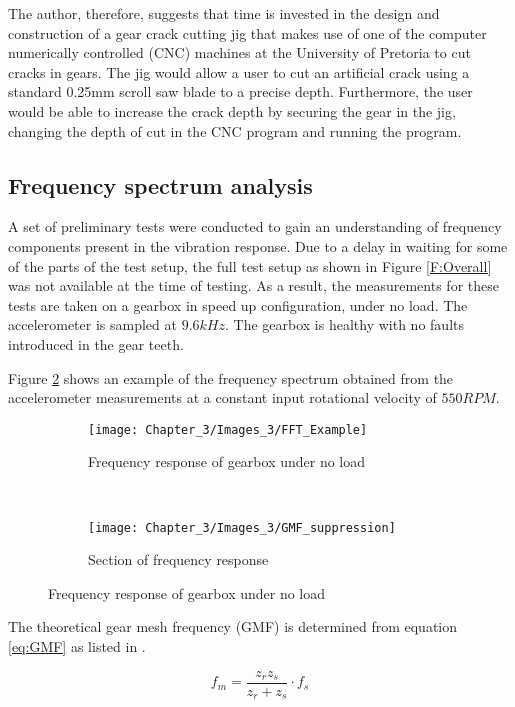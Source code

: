 The author, therefore, suggests that time is invested in the design and construction of a gear crack cutting jig that makes use of one of the computer numerically controlled (CNC) machines at the University of Pretoria to cut cracks in gears. The jig would allow a user to cut an artificial crack using a standard 0.25mm scroll saw blade to a precise depth. Furthermore, the user would be able to increase the crack depth by securing the gear in the jig, changing the depth of cut in the CNC program and running the program.




\subsection{Frequency spectrum analysis}
A set of preliminary tests were conducted to gain an understanding of frequency components present in the vibration response. Due to a delay in waiting for some of the parts of the test setup, the full test setup as shown in Figure \ref{F:Overall} was not available at the time of testing. As a result, the measurements for these tests are taken on a gearbox in speed up configuration, under no load. The accelerometer is sampled at $9.6 kHz$. The gearbox is healthy with no faults introduced in the gear teeth.

Figure \ref{F:Freq_res} shows an example of the frequency spectrum obtained from the accelerometer measurements at a constant input rotational velocity of $550RPM$.

\begin{figure}[H]
	\centering
	\begin{subfigure}{0.49\textwidth}
		\texttt{[image: Chapter\_3/Images\_3/FFT\_Example]}
		\caption{Frequency response of gearbox under no load}
	\end{subfigure}
	~
	\begin{subfigure}{0.49\textwidth}
		\texttt{[image: Chapter\_3/Images\_3/GMF\_suppression]}
		\caption{Section of frequency response}
		\label{F:Scaled}
	\end{subfigure}
	
	\caption{Frequency response of gearbox under no load}
	\label{F:Freq_res}
\end{figure}



The theoretical gear mesh frequency (GMF) is determined from equation \ref{eq:GMF} as listed in \cite{Miao2015}. 

\begin{equation}
f_{m}=\frac{z_{r} z_{s}}{z_{r}+z_{s}} \cdot f_{s}
\label{eq:GMF}
\end{equation}

